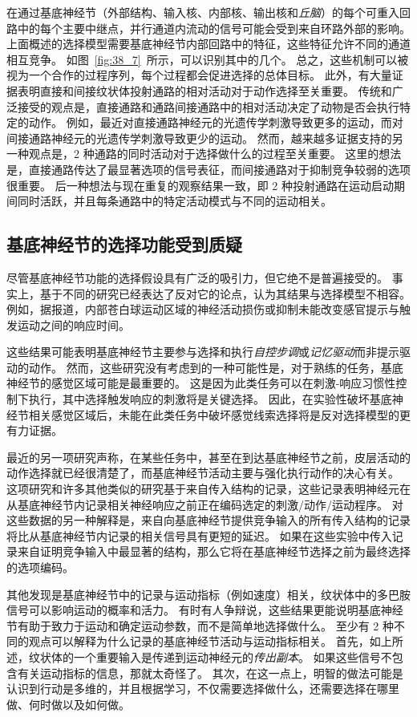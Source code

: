 在通过基底神经节（外部结构、输入核、内部核、输出核和\textit{丘脑}）的每个可重入回路中的每个主要中继点，并行通道内流动的信号可能会受到来自环路外部的影响。
上面概述的选择模型需要基底神经节内部回路中的特征，这些特征允许不同的通道相互竞争。
如图~\ref{fig:38_7}~所示，可以识别其中的几个。
总之，这些机制可以被视为一个合作的过程序列，每个过程都会促进选择的总体目标。
此外，有大量证据表明直接和间接纹状体投射通路的相对活动对于动作选择至关重要。
传统和广泛接受的观点是，直接通路和通路间接通路中的相对活动决定了动物是否会执行特定的动作。
例如，最近对直接通路神经元的光遗传学刺激导致更多的运动，而对间接通路神经元的光遗传学刺激导致更少的运动。
然而，越来越多证据支持的另一种观点是，2 种通路的同时活动对于选择做什么的过程至关重要。
这里的想法是，直接通路传达了最显著选项的信号表征，而间接通路对于抑制竞争较弱的选项很重要。
后一种想法与现在重复的观察结果一致，即 2 种投射通路在运动启动期间同时活跃，并且每条通路中的特定活动模式与不同的运动相关。



\subsection{基底神经节的选择功能受到质疑}

尽管基底神经节功能的选择假设具有广泛的吸引力，但它绝不是普遍接受的。
事实上，基于不同的研究已经表达了反对它的论点，认为其结果与选择模型不相容。
例如，据报道，内部苍白球运动区域的神经活动损伤或抑制未能改变感官提示与触发运动之间的响应时间。


这些结果可能表明基底神经节主要参与选择和执行\textit{自控步调}或\textit{记忆驱动}而非提示驱动的动作。
然而，这些研究没有考虑到的一种可能性是，对于熟练的任务，基底神经节的感觉区域可能是最重要的。
这是因为此类任务可以在刺激-响应习惯性控制下执行，其中选择触发响应的刺激将是关键选择。
因此，在实验性破坏基底神经节相关感觉区域后，未能在此类任务中破坏感觉线索选择将是反对选择模型的更有力证据。


最近的另一项研究声称，在某些任务中，甚至在到达基底神经节之前，皮层活动的动作选择就已经很清楚了，而基底神经节活动主要与强化执行动作的决心有关。
这项研究和许多其他类似的研究基于来自传入结构的记录，这些记录表明神经元在从基底神经节内记录相关神经响应之前正在编码选定的刺激/动作/运动程序。
对这些数据的另一种解释是，来自向基底神经节提供竞争输入的所有传入结构的记录将比从基底神经节内记录的相关信号具有更短的延迟。
如果在这些实验中传入记录来自证明竞争输入中最显著的结构，那么它将在基底神经节选择之前为最终选择的选项编码。


其他发现是基底神经节中的记录与运动指标（例如速度）相关，纹状体中的多巴胺信号可以影响运动的概率和活力。
有时有人争辩说，这些结果更能说明基底神经节有助于致力于运动和确定运动参数，而不是简单地选择做什么。
至少有 2 种不同的观点可以解释为什么记录的基底神经节活动与运动指标相关。
首先，如上所述，纹状体的一个重要输入是传递到运动神经元的\textit{传出副本}。
如果这些信号不包含有关运动指标的信息，那就太奇怪了。
其次，在这一点上，明智的做法可能是认识到行动是多维的，并且根据学习，不仅需要选择做什么，还需要选择在哪里做、何时做以及如何做。


